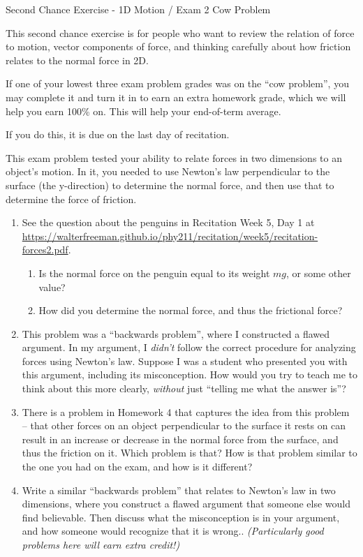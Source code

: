 \documentclass[12pt]{article}
\begin{document}
\begin{center}
\Large
\sc Second Chance Exercise - 1D Motion / Exam 2 Cow Problem \rm





\normalsize
This second chance exercise is for people who want to review the relation of force to motion, vector components of force, and thinking carefully about how friction relates to the normal force in 2D.

If one of your lowest three exam problem grades was on the ``cow problem'', you may complete it and turn it in to earn an extra homework grade, which we will help you earn 100\% on. This will help your end-of-term average.

If you do this, it is due on the last day of recitation.

\end{center}

\vspace{1.5in}

This exam problem tested your ability to relate forces in two dimensions to an object's motion. In it, you needed to use Newton's law perpendicular to the surface (the y-direction) to determine the normal force, and then use that to determine the force of friction.

\begin{enumerate}
		\item See the question about the penguins in Recitation Week 5, Day 1 at \url{https://walterfreeman.github.io/phy211/recitation/week5/recitation-forces2.pdf}. 
		\begin{enumerate}
			\item Is the normal force on the penguin equal to its weight $mg$, or some other value?
			\item How did you determine the normal force, and thus the frictional force?
		\end{enumerate}
	\item This problem was a ``backwards problem'', where I constructed a flawed argument. In my argument, I {\it didn't} follow the correct procedure for analyzing forces using Newton's law. Suppose I was a student who presented you with this argument, including its misconception. How would you try to teach me to think about this more clearly, {\it without} just ``telling me what the answer is''?

	\item There is a problem in Homework 4 that captures the idea from this problem -- that other forces on an object perpendicular to the surface it rests on can result in an increase or decrease in the normal force from the surface, and thus the friction on it. Which problem is that? How is that problem similar to the one you had on the exam, and how is it different?

    \item Write a similar ``backwards problem'' that relates to Newton's law in two dimensions, where you construct a flawed argument that someone else would find believable. Then discuss what the misconception is in your argument, and how someone would recognize that it is wrong.. {\it (Particularly good problems here will earn extra credit!)}
\end{enumerate}
\end{document}
